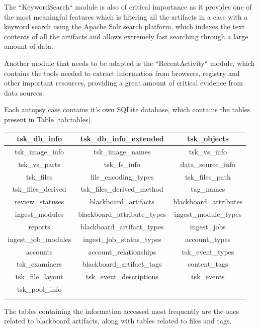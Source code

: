 The ``KeywordSearch`` module is also of critical importance as it provides one of the most meaningful features which is filtering all the artifacts in a case with a keyword
search using the Apache Solr search platform, which indexes the text contents of all the artifacts and allows extremely fast searching through a large amount of data.  

Another module that needs to be adapted is the ``RecentActivity`` module, which contains the tools needed to extract information from browsers, registry and other important resources, providing a great amount of
critical evidence from data sources.

Each autopsy case contains it's own SQLite \cite{sqlite} database, which contains the tables present in Table \ref{tab:tables}.

\begin{tabularx}{\textwidth}{|c|c|c|}
    \hline
    tsk\_db\_info & tsk\_db\_info\_extended & tsk\_objects \\
    \hline
    tsk\_image\_info & tsk\_image\_names & tsk\_vs\_info \\
    \hline
    tsk\_vs\_parts & tsk\_fs\_info & data\_source\_info \\
    \hline
    tsk\_files & file\_encoding\_types & tsk\_files\_path \\
    \hline
    tsk\_files\_derived & tsk\_files\_derived\_method & tag\_names \\
    \hline
    review\_statuses & blackboard\_artifacts & blackboard\_attributes \\
    \hline
    ingest\_modules & blackboard\_attribute\_types & ingest\_module\_types \\
    \hline
    reports & blackboard\_artifact\_types & ingest\_jobs \\
    \hline
    ingest\_job\_modules & ingest\_job\_status\_types & account\_types \\
    \hline
    accounts & account\_relationships & tsk\_event\_types \\
    \hline
    tsk\_examiners & blackboard\_artifact\_tags & content\_tags \\
    \hline
    tsk\_file\_layout & tsk\_event\_descriptions & tsk\_events \\
    \hline
    tsk\_pool\_info & & \\
    \hline
    \caption{Case Database Tables}
    \label{tab:tables}
\end{tabularx}

The tables containing the information accessed most frequently are the ones related to blackboard artifacts, along with tables related to files and tags.

